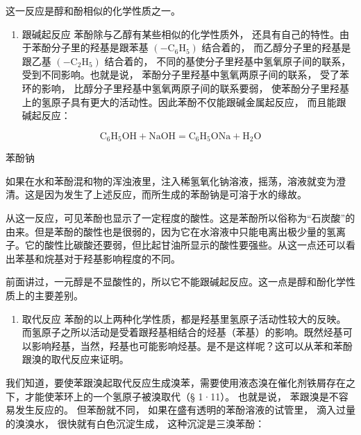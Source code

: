 这一反应是醇和酚相似的化学性质之一。

\begin{enumerate}[start=2]
\item
  跟碱起反应 苯酚除与乙醇有某些相似的化学性质外，
  还具有自己的特性。由于苯酚分子里的羟基是跟苯基
  \((-\mathrm{C}_{6} \mathrm{H}_{5})\) 结合着的，
  而乙醇分子里的羟基是跟乙基 \((- \mathrm{C}_{2} \mathrm{H}_{5})\)
  结合着的， 不同的基使分子里羟基中氢氧原子间的联系，
  受到不同影响。也就是说， 苯酚分子里羟基中氢氧两原子间的联系，
  受了苯环的影响， 比醇分子里羟基中氢氧两原子间的联系要弱，
  使苯酚分子里羟基上的氢原子具有更大的活动性。因此苯酚不仅能跟碱金属起反应，
  而且能跟碱起反应：
\end{enumerate}

\[
\mathrm{C} _ {6} \mathrm{H} _ {5} \mathrm{OH} + \mathrm{NaOH} = \mathrm{C} _ {6} \mathrm{H} _ {5} \mathrm{ONa} + \mathrm{H} _ {2} \mathrm{O}
\]

苯酚钠

如果在水和苯酚混和物的浑浊液里，注入稀氢氧化钠溶液，摇荡，溶液就变为澄清。这是因为发生了上述反应，而所生成的苯酚钠是可溶于水的缘故。

从这一反应，可见苯酚也显示了一定程度的酸性。这是苯酚所以俗称为``石炭酸''的由来。但是苯酚的酸性也是很弱的，因为它在水溶液中只能电离出极少量的氢离子。它的酸性比碳酸还要弱，但比起甘油所显示的酸性要强些。从这一点还可以看出苯基和烷基对于羟基影响程度的不同。

前面讲过，一元醇是不显酸性的，所以它不能跟碱起反应。这一点是醇和酚化学性质上的主要差别。

\begin{enumerate}[start=3]
\item
  取代反应
  苯酚的以上两种化学性质，都是羟基里氢原子活动性较大的反映。而氢原子之所以活动是受着跟羟基相结合的烃基（苯基）的影响。既然烃基可以影响羟基，当然，羟基也可能影响烃基。是不是这样呢？这可以从苯和苯酚跟溴的取代反应来证明。
\end{enumerate}

我们知道，要使苯跟溴起取代反应生成溴苯，需要使用液态溴在催化剂铁屑存在之下，才能使苯环上的一个氢原子被溴取代（§
1·11）。 也就是说， 苯跟溴是不容易发生反应的。 但苯酚就不同，
如果在盛有透明的苯酚溶液的试管里， 滴入过量的溴溴水，
很快就有白色沉淀生成， 这种沉淀是三溴苯酚：

